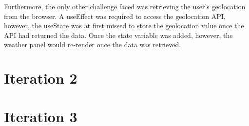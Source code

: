 Furthermore, the only other challenge faced was retrieving the user's geolocation from the browser. A useEffect was required to access the geolocation API, however, the useState was at first missed to store the geolocation value once the API had returned the data. Once the state variable was added, however, the weather panel would re-render once the data was retrieved.

\section{Iteration 2}
\label{implementation:iteration2}

\section{Iteration 3}
\label{implementation:iteration3}
